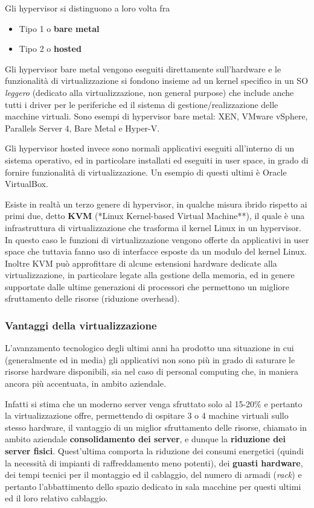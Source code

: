 Gli hypervisor si distinguono a loro volta fra

\begin{itemize}
\tightlist
\item
  Tipo 1 o \textbf{bare metal}
\item
  Tipo 2 o \textbf{hosted}
\end{itemize}

Gli hypervisor bare metal vengono eseguiti direttamente sull'hardware e
le funzionalità di virtualizzazione si fondono insieme ad un kernel
specifico in un SO \emph{leggero} (dedicato alla virtualizzazione, non
general purpose) che include anche tutti i driver per le periferiche ed
il sistema di gestione/realizzazione delle macchine virtuali. Sono
esempi di hypervisor bare metal: XEN, VMware vSphere, Parallels Server
4, Bare Metal e Hyper-V.

Gli hypervisor hosted invece sono normali applicativi eseguiti
all'interno di un sistema operativo, ed in particolare installati ed
eseguiti in user space, in grado di fornire funzionalità di
virtualizzazione. Un esempio di questi ultimi è Oracle VirtualBox.

Esiste in realtà un terzo genere di hypervisor, in qualche misura ibrido
rispetto ai primi due, detto \textbf{KVM} (*Linux Kernel-based Virtual
Machine**), il quale è una infrastruttura di virtualizzazione che
trasforma il kernel Linux in un hypervisor. In questo caso le funzioni
di virtualizzazione vengono offerte da applicativi in user space che
tuttavia fanno uso di interfacce esposte da un modulo del kernel Linux.
Inoltre KVM può approfittare di alcune estensioni hardware dedicate alla
virtualizzazione, in particolare legate alla gestione della memoria, ed
in genere supportate dalle ultime generazioni di processori che
permettono un migliore sfruttamento delle risorse (riduzione overhead).

\subsubsection{Vantaggi della
virtualizzazione}\label{vantaggi-della-virtualizzazione}

L'avanzamento tecnologico degli ultimi anni ha prodotto una situazione
in cui (generalmente ed in media) gli applicativi non sono più in grado
di saturare le risorse hardware disponibili, sia nel caso di personal
computing che, in maniera ancora più accentuata, in ambito aziendale.

Infatti si stima che un moderno server venga sfruttato solo al 15-20\% e
pertanto la virtualizzazione offre, permettendo di ospitare 3 o 4
machine virtuali sullo stesso hardware, il vantaggio di un miglior
sfruttamento delle risorse, chiamato in ambito aziendale
\textbf{consolidamento dei server}, e dunque la \textbf{riduzione dei
server fisici}. Quest'ultima comporta la riduzione dei consumi
energetici (quindi la necessità di impianti di raffreddamento meno
potenti), dei \textbf{guasti hardware}, dei tempi tecnici per il
montaggio ed il cablaggio, del numero di armadi (\emph{rack}) e pertanto
l'abbattimento dello spazio dedicato in sala macchine per questi ultimi
ed il loro relativo cablaggio.

